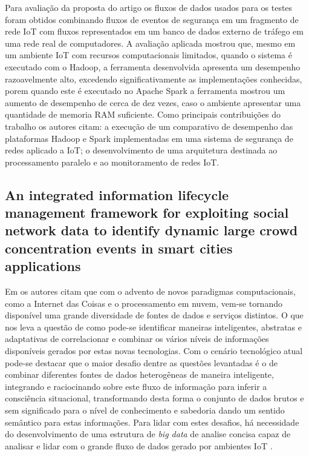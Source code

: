 \documentclass[ti,table]{texufpel} %
\begin{document}
	Para avaliação da proposta do artigo os fluxos de dados usados para os testes foram obtidos combinando fluxos de eventos de segurança em um fragmento de rede IoT com fluxos representados em um banco de dados externo de tráfego em uma rede real de computadores. A avaliação aplicada mostrou que, mesmo em um ambiente IoT com recursos computacionais limitados, quando o sistema é executado com o Hadoop, a ferramenta desenvolvida apresenta um desempenho razoavelmente alto, excedendo significativamente as implementações conhecidas, porem quando este é executado no Apache Spark a ferramenta mostrou um aumento de desempenho de cerca de dez vezes, caso o ambiente apresentar uma quantidade de memoria RAM suficiente. Como principais contribuições do trabalho os autores citam: a execução de um comparativo de desempenho das plataformas Hadoop e Spark implementadas em uma sistema de segurança de redes aplicado a IoT; o desenvolvimento de uma arquitetura destinada ao processamento paralelo e ao monitoramento de redes IoT. 
	


\subsection{An integrated information lifecycle management framework for exploiting social network data to identify dynamic large crowd concentration events in smart cities applications}

	Em \cite{art9kousiouris2018integrated} os autores citam que com o advento de novos paradigmas computacionais, como a Internet das Coisas e o processamento em nuvem, vem-se tornando disponível uma grande diversidade de fontes de dados e serviços distintos. O que nos leva a questão de como pode-se identificar maneiras inteligentes, abstratas e adaptativas de correlacionar e combinar os vários níveis de informações disponíveis gerados por estas novas tecnologias. Com o cenário tecnológico atual pode-se destacar que o maior desafio dentre as questões levantadas é o de combinar diferentes fontes de dados heterogêneas de maneira inteligente, integrando e raciocinando sobre este fluxo de informação para inferir a consciência situacional, transformando desta forma o conjunto de dados brutos e sem significado para o nível de conhecimento e sabedoria dando um sentido semântico para estas informações. Para lidar com estes desafios, há necessidade do desenvolvimento de uma estrutura de \textit{big data} de analise concisa capaz de analisar e lidar com o grande fluxo de dados gerado por ambientes IoT .	
	
\end{document}
